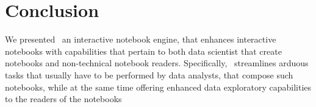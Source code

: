 \section{Conclusion}
\label{section:conclusion}

We presented \projname\ an interactive notebook engine, that enhances interactive notebooks with capabilities that pertain to both data scientist that create notebooks and non-technical notebook readers. Specifically, \projname\ streamlines arduous tasks that usually have to be performed by data analysts, that compose such notebooks, while at the same time offering enhanced data exploratory capabilities to the readers of the notebooks